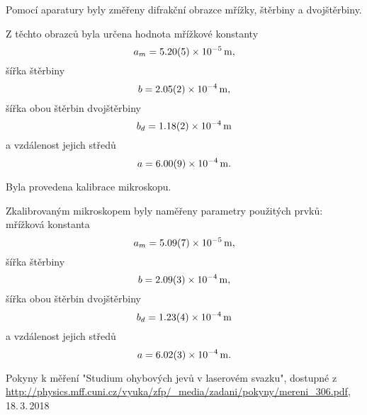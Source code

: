 \documentclass{protokol}
\begin{document}
    Pomocí aparatury byly změřeny difrakční obrazce mřížky, štěrbiny a dvojštěrbiny.

    Z těchto obrazců byla určena hodnota mřížkové konstanty
    $$ a_m = \SI{5.20 \pm 0.05 e-5}{m}, $$
    šířka štěrbiny 
    $$ b = \SI{2.05 \pm 0.02 e-4}{m}, $$
    šířka obou štěrbin dvojštěrbiny
    $$ b_d = \SI{1.18 \pm 0.02 e-4}{m} $$
    a vzdálenost jejich středů
    $$ a = \SI{6.00 \pm 0.09 e-4}{m}. $$

    Byla provedena kalibrace mikroskopu.

    Zkalibrovaným mikroskopem byly naměřeny parametry použitých prvků:\\
    mřížková konstanta
    $$ a_m = \SI{5.09 \pm 0.07 e-5}{m},$$
    šířka štěrbiny
    $$ b = \SI{2.09 \pm 0.03 e-4}{m},$$
    šířka obou štěrbin dvojštěrbiny
    $$ b_d = \SI{1.23 \pm 0.04 e-4}{m} $$
    a vzdálenost jejich středů
    $$ a = \SI{6.02 \pm 0.03 e-4}{m}. $$

  \begin{thebibliography}{}

    Pokyny k měření "Studium ohybových jevů v laserovém svazku", dostupné z\\ \url{http://physics.mff.cuni.cz/vyuka/zfp/_media/zadani/pokyny/mereni_306.pdf}, 18.\,3.\,2018
  
  \end{thebibliography}
\end{document}
